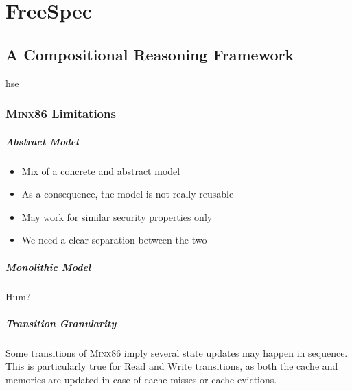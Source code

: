 \documentclass[oneside,a4paper]{memoir}
\theoremstyle{break}
\begin{document}
\chapter{FreeSpec}

\section{A Compositional Reasoning Framework}

\ac{hse}

\subsection{{\scshape Minx86} Limitations}

\paragraph{Abstract Model}
%
\begin{itemize}
\item Mix of a concrete and abstract model
\item As a consequence, the model is not really reusable
\item May work for similar security properties only
\item We need a clear separation between the two
\end{itemize}

\paragraph{Monolithic Model}
%
Hum?

\paragraph{Transition Granularity}
%
Some transitions of {\scshape Minx86} imply several state updates may happen in
sequence.
%
This is particularly true for \( \mathrm{Read} \) and \( \mathrm{Write} \)
transitions, as both the cache and memories are updated in case of cache misses
or cache evictions.
\end{document}
